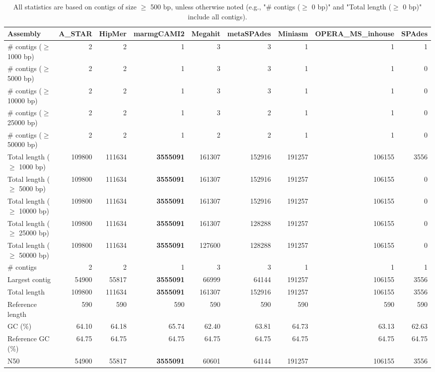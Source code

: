 \documentclass[12pt,a4paper]{article}
\begin{document}
\begin{table}[ht]
\begin{center}
\caption{All statistics are based on contigs of size $\geq$ 500 bp, unless otherwise noted (e.g., "\# contigs ($\geq$ 0 bp)" and "Total length ($\geq$ 0 bp)" include all contigs).}
\begin{tabular}{|l*{8}{|r}|}
\hline
Assembly & A\_STAR & HipMer & marmgCAMI2 & Megahit & metaSPAdes & Miniasm & OPERA\_MS\_inhouse & SPAdes \\ \hline
\# contigs ($\geq$ 1000 bp) & 2 & 2 & 1 & 3 & 3 & 1 & 1 & 1 \\ \hline
\# contigs ($\geq$ 5000 bp) & 2 & 2 & 1 & 3 & 3 & 1 & 1 & 0 \\ \hline
\# contigs ($\geq$ 10000 bp) & 2 & 2 & 1 & 3 & 3 & 1 & 1 & 0 \\ \hline
\# contigs ($\geq$ 25000 bp) & 2 & 2 & 1 & 3 & 2 & 1 & 1 & 0 \\ \hline
\# contigs ($\geq$ 50000 bp) & 2 & 2 & 1 & 2 & 2 & 1 & 1 & 0 \\ \hline
Total length ($\geq$ 1000 bp) & 109800 & 111634 & {\bf 3555091} & 161307 & 152916 & 191257 & 106155 & 3556 \\ \hline
Total length ($\geq$ 5000 bp) & 109800 & 111634 & {\bf 3555091} & 161307 & 152916 & 191257 & 106155 & 0 \\ \hline
Total length ($\geq$ 10000 bp) & 109800 & 111634 & {\bf 3555091} & 161307 & 152916 & 191257 & 106155 & 0 \\ \hline
Total length ($\geq$ 25000 bp) & 109800 & 111634 & {\bf 3555091} & 161307 & 128288 & 191257 & 106155 & 0 \\ \hline
Total length ($\geq$ 50000 bp) & 109800 & 111634 & {\bf 3555091} & 127600 & 128288 & 191257 & 106155 & 0 \\ \hline
\# contigs & 2 & 2 & 1 & 3 & 3 & 1 & 1 & 1 \\ \hline
Largest contig & 54900 & 55817 & {\bf 3555091} & 66999 & 64144 & 191257 & 106155 & 3556 \\ \hline
Total length & 109800 & 111634 & {\bf 3555091} & 161307 & 152916 & 191257 & 106155 & 3556 \\ \hline
Reference length & 590 & 590 & 590 & 590 & 590 & 590 & 590 & 590 \\ \hline
GC (\%) & 64.10 & 64.18 & 65.74 & 62.40 & 63.81 & 64.73 & 63.13 & 62.63 \\ \hline
Reference GC (\%) & 64.75 & 64.75 & 64.75 & 64.75 & 64.75 & 64.75 & 64.75 & 64.75 \\ \hline
N50 & 54900 & 55817 & {\bf 3555091} & 60601 & 64144 & 191257 & 106155 & 3556 \\ \hline

\end{tabular}
\end{center}
\end{table}
\end{document}
